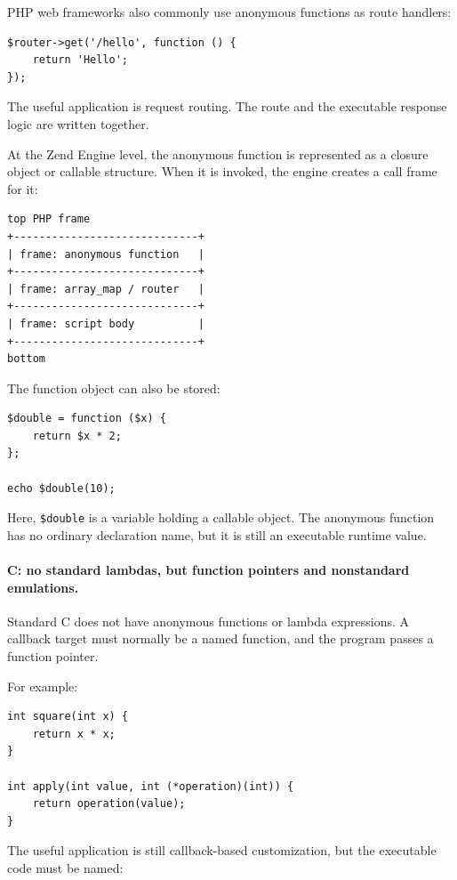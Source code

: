 PHP web frameworks also commonly use anonymous functions as route handlers:

\begin{verbatim}
$router->get('/hello', function () {
    return 'Hello';
});
\end{verbatim}

The useful application is request routing. The route and the executable response logic are written together.

At the Zend Engine level, the anonymous function is represented as a closure object or callable structure. When it is invoked, the engine creates a call frame for it:

\begin{verbatim}
top PHP frame
+-----------------------------+
| frame: anonymous function   |
+-----------------------------+
| frame: array_map / router   |
+-----------------------------+
| frame: script body          |
+-----------------------------+
bottom
\end{verbatim}

The function object can also be stored:

\begin{verbatim}
$double = function ($x) {
    return $x * 2;
};

echo $double(10);
\end{verbatim}

Here, \texttt{\$double} is a variable holding a callable object. The anonymous function has no ordinary declaration name, but it is still an executable runtime value.

\paragraph{C: no standard lambdas, but function pointers and nonstandard emulations.}

Standard C does not have anonymous functions or lambda expressions. A callback target must normally be a named function, and the program passes a function pointer.

For example:

\begin{verbatim}
int square(int x) {
    return x * x;
}

int apply(int value, int (*operation)(int)) {
    return operation(value);
}
\end{verbatim}

The useful application is still callback-based customization, but the executable code must be named:

